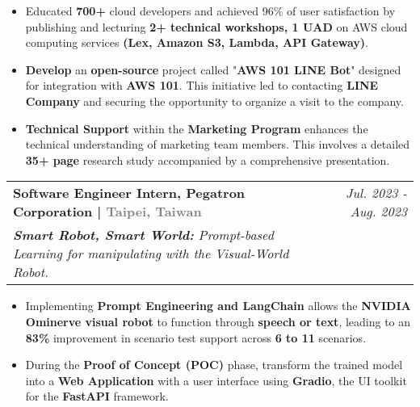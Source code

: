 \documentclass[a4paper,11pt]{article}
\makeatletter
\newcommand{\resumeSubheading}[4]{
\vspace{0.5mm}\item
    \begin{tabular*}{0.98\textwidth}[t]{l@{\extracolsep{\fill}}r}
        \textbf{#1} & \textit{\footnotesize{#4}} \\
        \textit{\footnotesize{#3}} &  \footnotesize{#2}\\
    \end{tabular*}
    \vspace{-2.4mm}
}
\newcommand{\resumeItemListStart}{\begin{justify}\begin{itemize}[
    leftmargin=3ex, 
    rightmargin=2ex, 
    noitemsep,
    labelsep=1.2mm,
    itemsep=0.5mm
    ]\small
}
\newcommand{\resumeItemListEnd}{\end{itemize}\end{justify}\vspace{-2mm}}
\makeatother
\begin{document}
            \resumeItemListStart
                \item {Educated \textbf{700+} cloud developers and achieved 96\% of user satisfaction by publishing and lecturing \textbf{2+ technical workshops, 1 UAD} on AWS cloud computing services \textbf{(Lex, Amazon S3, Lambda, API Gateway)}.}
                \item {\textbf{Develop} an \textbf{open-source} project called "\textbf{AWS 101 LINE Bot}" designed for integration with \textbf{AWS 101}. This initiative led to contacting \textbf{LINE Company} and securing the opportunity to organize a visit to the company.}
                \item {\textbf{Technical Support} within the \textbf{Marketing Program} enhances the technical understanding of marketing team members. This involves a detailed \textbf{35+ page} research study accompanied by a comprehensive presentation.}
            \resumeItemListEnd

        \vspace{-2.0mm}

        \resumeSubheading
            { Software Engineer Intern, Pegatron Corporation | \textcolor{gray}{\footnotesize{\faMapMarker}} \textcolor{gray}{\footnotesize{Taipei, Taiwan}}}
            {}
            {\textbf{Smart Robot, Smart World:} Prompt-based Learning for manipulating with the Visual-World Robot.}
            {Jul. 2023 - Aug. 2023}

            \vspace{-1.0mm}

            \resumeItemListStart
                \item {Implementing \textbf{Prompt Engineering and LangChain} allows the \textbf{NVIDIA Ominerve visual robot} to function through \textbf{speech or text}, leading to an \textbf{83\%} improvement in scenario test support across \textbf{6 to 11} scenarios.}
                \item {During the \textbf{Proof of Concept (POC)} phase, transform the trained model into a \textbf{Web Application} with a user interface using \textbf{Gradio}, the UI toolkit for the \textbf{FastAPI} framework.}
            \resumeItemListEnd


\end{document}

